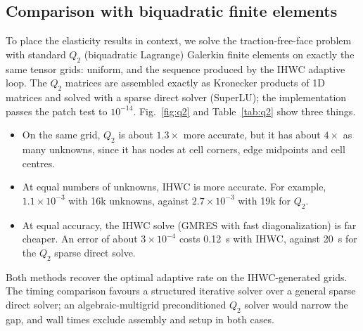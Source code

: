 \documentclass[preprint,12pt]{elsarticle}
\theoremstyle{remark}
\begin{document}
\subsection{Comparison with biquadratic finite elements}
To place the elasticity results in context, we solve the traction-free-face problem with standard
$Q_2$ (biquadratic Lagrange) Galerkin finite elements on exactly the same tensor grids: uniform, and the
sequence produced by the IHWC adaptive loop. The $Q_2$ matrices are assembled exactly as Kronecker
products of 1D matrices and solved with a sparse direct solver (SuperLU); the implementation passes the
patch test to $10^{-14}$. Fig.~\ref{fig:q2} and Table~\ref{tab:q2} show three things.
\begin{itemize}
\item On the same grid, $Q_2$ is about $1.3\times$ more accurate, but it has about $4\times$ as many
unknowns, since it has nodes at cell corners, edge midpoints and cell centres.
\item At equal numbers of unknowns, IHWC is more accurate. For example, $1.1\times10^{-3}$ with 16k
unknowns, against $2.7\times10^{-3}$ with 19k for $Q_2$.
\item At equal accuracy, the IHWC solve (GMRES with fast diagonalization) is far cheaper. An error
of about $3\times10^{-4}$ costs 0.12~s with IHWC, against 20~s for the $Q_2$ sparse direct solve.
\end{itemize}
Both methods recover the optimal adaptive rate on the IHWC-generated grids. The timing comparison
favours a structured iterative solver over a general sparse direct solver; an algebraic-multigrid
preconditioned $Q_2$ solver would narrow the gap, and wall times exclude assembly and setup in both cases.
\end{document}
